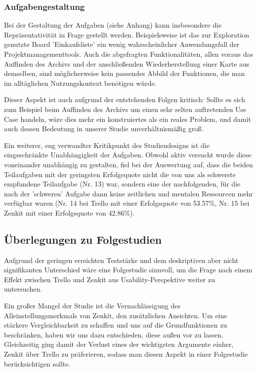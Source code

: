 \subsubsection{Aufgabengestaltung}
Bei der Gestaltung der Aufgaben (siehe Anhang) kann insbesondere die Repräsentativität in Frage gestellt werden. Beispielsweise ist das zur Exploration genutzte Board 'Einkaufsliste' ein wenig wahrscheinlicher Anwendungsfall der Projektmanagementtools. Auch die abgefragten Funktionalitäten, allen voraus das Auffinden des Archivs und der anschließenden Wiederherstellung einer Karte aus demselben, sind möglicherweise kein passendes Abbild der Funktionen, die man im alltäglichen Nutzungskontext benötigen würde.

Dieser Aspekt ist auch aufgrund der entstehenden Folgen kritisch: Sollte es sich zum Beispiel beim Auffinden des Archivs um einen sehr selten auftretenden Use Case handeln, wäre dies mehr ein konstruiertes als ein reales Problem, und damit auch dessen Bedeutung in unserer Studie unverhältnismäßig groß.

Ein weiterer, eng verwandter Kritikpunkt des Studiendesigns ist die eingeschränkte Unabhängigkeit der Aufgaben. Obwohl aktiv versucht wurde diese voneinander unabhängig zu gestalten, fiel bei der Auswertung auf, dass die beiden Teilaufgaben mit der geringsten Erfolgsquote nicht die von uns als schwerste empfundene Teilaufgabe (Nr. 13) war, sondern eine der nachfolgenden, für die nach der 'schweren' Aufgabe dann keine zeitlichen und mentalen Ressourcen mehr verfügbar waren (Nr. 14 bei Trello mit einer Erfolgsquote von 53.57\%, Nr. 15 bei Zenkit mit einer Erfolgsquote von 42.86\%). 


\subsection{Überlegungen zu Folgestudien}
Aufgrund der geringen erreichten Teststärke und dem deskriptiven aber nicht signifikanten Unterschied wäre eine Folgestudie sinnvoll, um die Frage nach einem Effekt zwischen Trello und Zenkit aus Usability-Perspektive weiter zu untersuchen.

Ein großer Mangel der Studie ist die Vernachlässigung des Alleinstellungsmerkmals von Zenkit, den zusätzlichen Ansichten. Um eine stärkere Vergleichbarkeit zu schaffen und uns auf die Grundfunktionen zu beschränken, haben wir uns dazu entschieden, diese außen vor zu lassen. Gleichzeitig ging damit der Verlust eines der wichtigsten Argumente einher, Zenkit über Trello zu präferieren, sodass man diesen Aspekt in einer Folgestudie berücksichtigen sollte.
    
